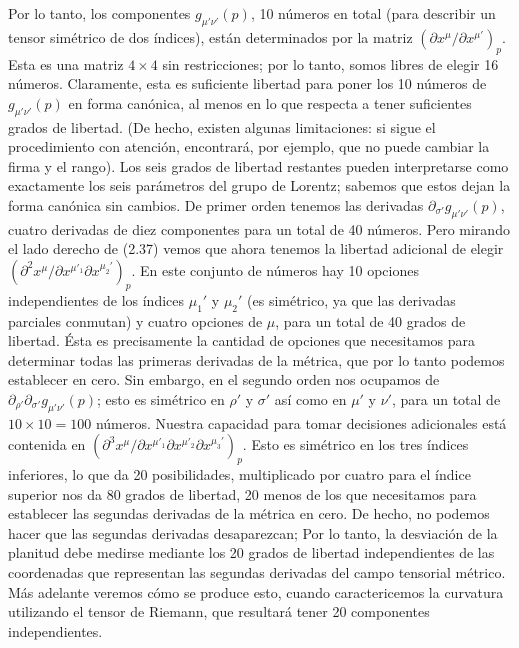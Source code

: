 \documentclass[11pt,b5paper,openany,twoside]{book}
\newcommand{\p}[1]{{\partial_{#1}}}
\begin{document}
Por lo tanto, los componentes $g_{\mu'\nu'}(p)$, 10 números en total (para describir un tensor simétrico de dos índices), están determinados por la matriz $(\partial x^\mu/\partial x^{\mu'})_p$.
Esta es una matriz $4\times 4$ sin restricciones; por lo tanto, somos libres de elegir 16 números.
Claramente, esta es suficiente libertad para poner los 10 números de $g_{\mu'\nu'}(p)$ en forma canónica, al menos en lo que respecta a tener suficientes grados de libertad.
(De hecho, existen algunas limitaciones: si sigue el procedimiento con atención, encontrará, por ejemplo, que no puede cambiar la firma y el rango).
Los seis grados de libertad restantes pueden interpretarse como exactamente los seis parámetros del grupo de Lorentz; sabemos que estos dejan la forma canónica sin cambios.
De primer orden tenemos las derivadas $\p{\sigma'}g_{\mu'\nu'}(p)$, cuatro derivadas de diez componentes para un total de 40 números.
Pero mirando el lado derecho de (2.37) vemos que ahora tenemos la libertad adicional de elegir $(\partial^2 x^\mu/\partial x^{\mu'_1} \partial x^{\mu_2'})_p$.
En este conjunto de números hay 10 opciones independientes de los índices $\mu_1'$ y $\mu_2'$ (es simétrico, ya que las derivadas parciales conmutan) y cuatro opciones de $\mu$, para un total de 40 grados de libertad.
Ésta es precisamente la cantidad de opciones que necesitamos para determinar todas las primeras derivadas de la métrica, que por lo tanto podemos establecer en cero.
Sin embargo, en el segundo orden nos ocupamos de $\p{\rho'}\p{\sigma'}g_{\mu'\nu'}(p)$; esto es simétrico en $\rho'$ y $\sigma'$ así como en $\mu'$ y $\nu'$, para un total de $10\times 10=100$ números.
Nuestra capacidad para tomar decisiones adicionales está contenida en $(\partial^3 x^\mu/\partial x^{\mu'_1}\partial x^{\mu'_2} \partial x^{\mu_3'})_p$.
Esto es simétrico en los tres índices inferiores, lo que da 20 posibilidades, multiplicado por cuatro para el índice superior nos da 80 grados de libertad, 20 menos de los que necesitamos para establecer las segundas derivadas de la métrica en cero.
De hecho, no podemos hacer que las segundas derivadas desaparezcan; Por lo tanto, la desviación de la planitud debe medirse mediante los 20 grados de libertad independientes de las coordenadas que representan las segundas derivadas del campo tensorial métrico.
Más adelante veremos cómo se produce esto, cuando caractericemos la curvatura utilizando el tensor de Riemann, que resultará tener 20 componentes independientes.
\end{document}
